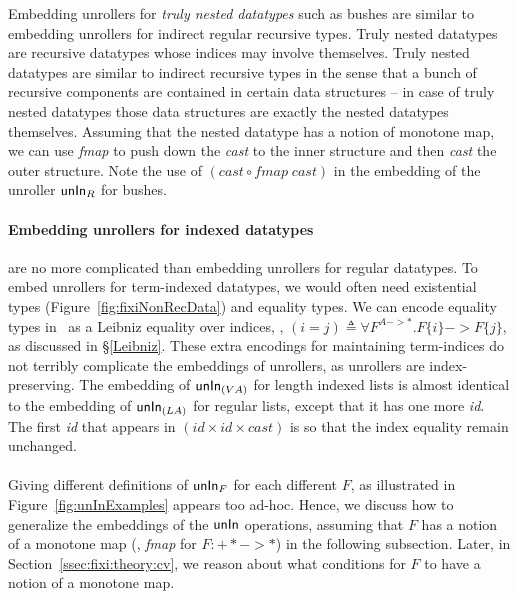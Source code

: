 Embedding unrollers for \emph{truly nested datatypes} \cite{AbeMatUus05}
such as bushes are similar to embedding unrollers for indirect regular
recursive types. Truly nested datatypes are recursive datatypes whose
indices may involve themselves. Truly nested datatypes are similar to
indirect recursive types in the sense that a bunch of recursive components
are contained in certain data structures -- in case of truly nested datatypes
those data structures are exactly the nested datatypes themselves.
Assuming that the nested datatype has a notion of monotone map, we can
use \textit{fmap} to push down the \textit{cast} to the inner structure
and then \textit{cast} the outer structure. Note the use of
$(\textit{cast} \circ \textit{fmap}\;\textit{cast})$ in the embedding of
the unroller $\mathsf{unIn}_R$ for bushes.

\paragraph{Embedding unrollers for indexed datatypes} are no more complicated
than embedding unrollers for regular datatypes. To embed unrollers
for term-indexed datatypes, we would often need existential types
(Figure~\ref{fig:fixiNonRecData}) and equality types. We can encode
equality types in \Fixi\ as a Leibniz equality over indices,
\ie, $(i=j) \triangleq \forall F^{A -> *}.F\{i\} -> F\{j\}$,
as discussed in \S\ref{Leibniz}. These extra encodings for maintaining
term-indices do not terribly complicate the embeddings of unrollers,
as unrollers are index-preserving. The embedding of $\mathsf{unIn}_{(V A)}$ for
length indexed lists is almost identical to the embedding of $\mathsf{unIn}_{(L A)}$
for regular lists, except that it has one more \textit{id}. The first
\textit{id} that appears in $(\textit{id}\times\textit{id}\times\textit{cast})$
is so that the index equality remain unchanged.

\paragraph{}
Giving different definitions of $\mathsf{unIn}_F$ for each different $F$, as illustrated
in Figure~\ref{fig:unInExamples} appears too ad-hoc. Hence, we discuss how to
generalize the embeddings of the $\mathsf{unIn}$ operations, assuming that $F$ has
a notion of a monotone map (\eg, \textit{fmap} for $F:+* ->*$) in the following
subsection. Later, in Section~\ref{ssec:fixi:theory:cv}, we reason about what
conditions for $F$ to have a notion of a monotone map.

